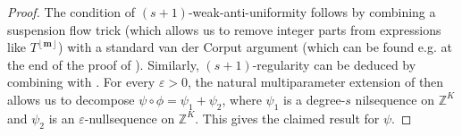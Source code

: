\documentclass[11pt]{amsart}
\theoremstyle{definition}
\DeclareMathOperator*{\oE}{\overline{\mathbb{E}}}
\DeclareMathOperator*{\E}{\mathbb{E}}
\newcommand{\C}{{\mathbb C}}
\newcommand{\Z}{{\mathbb Z}}
\newcommand{\bm}{{\mathbf{m}}}
\newcommand{\um}{{\underline{m}}}
\newcommand{\veps}{\varepsilon}
\newcommand{\inv}{^{-1}}
\newcommand{\1}{{\mathbf{1}}}
\newcommand{\abs}[1]{\mathopen{}\left| #1\mathclose{}\right|}
\newcommand{\floor}[1]{{\left \lfloor #1 \right \rfloor}}
\begin{document}
\begin{proof}
The condition of $(s+1)$-weak-anti-uniformity follows by combining a suspension flow trick \cite[Theorem~4.1]{Ko18} (which allows us to remove integer parts from expressions like $T^{\floor{\bm}}$) with a standard van der Corput argument (which can be found e.g. at the end of the proof of \cite[Theorem~2.6]{FH18}). Similarly, $(s+1)$-regularity can be deduced by combining \cite[Theorem~4.1]{Ko18} with \cite[Proposition~2.1]{FH18}. %
For every $\veps>0$, the natural multiparameter extension of \cite[Theorem 2.1]{Ko18} then allows us to decompose $\psi\circ \phi = \psi_1+\psi_2$, where $\psi_1$ is a degree-$s$ nilsequence on $\Z^{K}$ and $\psi_2$ is an $\veps$-nullsequence on $\Z^K$. This gives the claimed result for ${\psi}.$
%
\end{proof}
\end{document}
